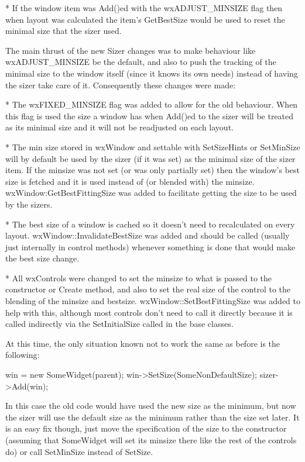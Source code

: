     * If the window item was Add()ed with the wxADJUST\_MINSIZE flag
      then when layout was calculated the item's GetBestSize would be
      used to reset the minimal size that the sizer used.

  The main thrust of the new Sizer changes was to make behaviour like
  wxADJUST\_MINSIZE be the default, and also to push the tracking of
  the minimal size to the window itself (since it knows its own needs)
  instead of having the sizer take care of it.  Consequently these
  changes were made:

    * The wxFIXED\_MINSIZE flag was added to allow for the old
      behaviour.  When this flag is used the size a window has when
      Add()ed to the sizer will be treated as its minimal size and it
      will not be readjusted on each layout.

    * The min size stored in wxWindow and settable with SetSizeHints or
      SetMinSize will by default be used by the sizer (if it was set)
      as the minimal size of the sizer item.  If the minsize was not
      set (or was only partially set) then the window's best size is
      fetched and it is used instead of (or blended with) the minsize.
      wxWindow:GetBestFittingSize was added to facilitate getting the
      size to be used by the sizers.

    * The best size of a window is cached so it doesn't need to
      recalculated on every layout.  wxWindow::InvalidateBestSize was
      added and should be called (usually just internally in control
      methods) whenever something is done that would make the best
      size change.

    * All wxControls were changed to set the minsize to what is passed
      to the constructor or Create method, and also to set the real
      size of the control to the blending of the minsize and bestsize.
      wxWindow::SetBestFittingSize was added to help with this,
      although most controls don't need to call it directly because it
      is called indirectly via the SetInitialSize called in the base
      classes.

  At this time, the only situation known not to work the same as
  before is the following:

    win = new SomeWidget(parent);
    win->SetSize(SomeNonDefaultSize);
    sizer->Add(win);

  In this case the old code would have used the new size as the
  minimum, but now the sizer will use the default size as the minimum
  rather than the size set later.  It is an easy fix though, just move
  the specification of the size to the constructor (assuming that
  SomeWidget will set its minsize there like the rest of the controls
  do) or call SetMinSize instead of SetSize.

